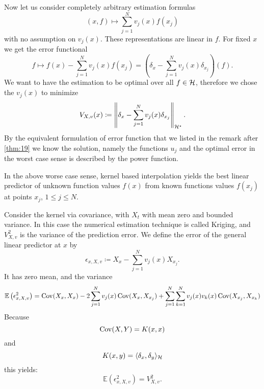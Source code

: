 \documentclass[../skript.tex]{subfiles}
\begin{document}
Now let us consider completely arbitrary estimation formulas
\[
	(x, f) \mapsto \sum_{j=1}^N v_j(x) f(x_j)
\]
with no assumption on $v_j(x)$.
These representations are linear in $f$.
For fixed $x$ we get the error functional
\[
	f \mapsto f(x) - \sum_{j=1}^N v_j(x) f(x_j) = \left( \delta_x - \sum_{j=1}^N v_j(x) \delta_{x_j} \right)(f).
\]
We want to have the estimation to be optimal over all $f \in \mathcal{H}$, therefore we chose the $v_j(x)$ to minimize
\[
	V_{X, v} (x) \coloneqq \left\| \delta_x - \sum_{j=1}^N v_j(x) \delta_{x_j} \right\|_{\mathcal{H}^{\star}}.
\]
By the equivalent formulation of error function that we listed in the remark after \cref{thm:19} we know the solution, namely the functions $u_j$ and the optimal error in the worst case sense is described by the power function.
\begin{theorem} %
\label{thm:26}
In the above worse case sense, kernel based interpolation yields the best linear predictor of unknown function values $f(x)$ from known functions values $f(x_j)$ at points $x_j$, $1 \leq j \leq N$.
\end{theorem}
Consider the kernel via covariance, with $X_t$ with mean zero and bounded variance. In this case the numerical estimation technique is called Kriging, and $V_{X, v}^2$ is the variance of the prediction error.
We define the error of the general linear predictor at $x$ by 
\[
	\epsilon_{x, X, v} \coloneqq X_{x} - \sum_{j=1}^N v_j(x) X_{x_j}.
\]
It has zero mean, and the variance
\[
	\mathbb{E} \left(\epsilon_{x, X, v}^2 \right) = \operatorname{Cov} (X_x, X_x) - 2\sum_{j=1}^N v_j(x) \operatorname{Cov}(X_x, X_{x_j}) + \sum_{j=1}^N \sum_{k=1}^N v_j(x) v_k(x) \operatorname{Cov}(X_{x_j}, X_{x_k}) \\
\]
Because
\[
	\operatorname{Cov}(X, Y) = K(x, x)
\]
and
\[
	K(x, y) = \langle \delta_x, \delta_y \rangle_{\mathcal{H}}
\]
this yields:
\[
	\mathbb{E} \left(\epsilon_{x, X, v}^2 \right) = V_{X, v}^2.
\]
\end{document}
